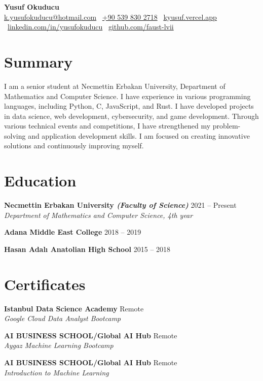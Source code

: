\documentclass[10pt,a4paper]{extarticle}
\begin{document}
\begin{center}
    \begin{minipage}{\textwidth}
        \centering
        {\LARGE\textbf{Yusuf Okuducu}}\\[10pt]
        \href{mailto:k.yusufokuducu@hotmail.com}{k.yusufokuducu@hotmail.com} \textbullet\
        \href{tel:+905398302718}{+90 539 830 2718} \textbullet\
        \href{https://kyusuf.vercel.app}{kyusuf.vercel.app} \textbullet\
        \href{https://linkedin.com/in/yusufokuducu}{linkedin.com/in/yusufokuducu} \textbullet\
        \href{https://github.com/faust-lvii}{github.com/faust-lvii}
    \end{minipage}
\end{center}
\section{Summary}
I am a senior student at Necmettin Erbakan University, Department of Mathematics
and Computer Science. I have experience in various programming languages,
including Python, C, JavaScript, and Rust. I have developed projects in data science,
web development, cybersecurity, and game development. Through various technical
events and competitions, I have strengthened my problem-solving and application
development skills. I am focused on creating innovative solutions and continuously
improving myself.
\section{Education}
\textbf{Necmettin Erbakan University \textit{(Faculty of Science)}} \hfill 2021 -- Present\\
\textit{Department of Mathematics and Computer Science, 4th year}

\textbf{Adana Middle East College} \hfill 2018 -- 2019

\textbf{Hasan Adalı Anatolian High School} \hfill 2015 -- 2018

\section{Certificates}
\textbf{Istanbul Data Science Academy} \hfill Remote\\
\textit{Google Cloud Data Analyst Bootcamp}

\textbf{AI BUSINESS SCHOOL/Global AI Hub} \hfill Remote\\
\textit{Aygaz Machine Learning Bootcamp}

\textbf{AI BUSINESS SCHOOL/Global AI Hub} \hfill Remote\\
\textit{Introduction to Machine Learning}
\end{document}
